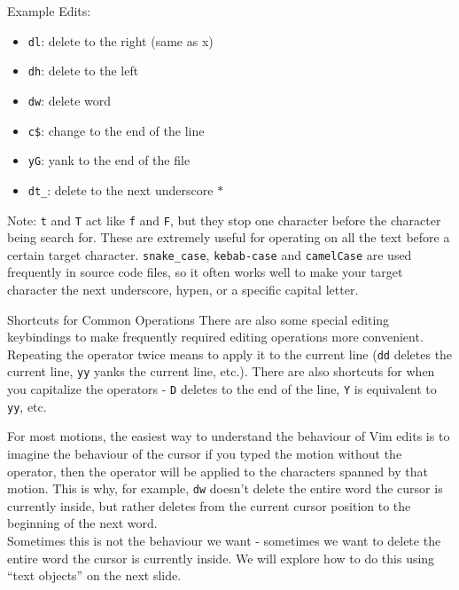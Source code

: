 \documentclass{beamer}
\begin{document}
\begin{frame}[fragile]
    Example Edits:
    \begin{itemize}
	\item \verb+dl+:  delete to the right (same as x)
	\item \verb+dh+:  delete to the left
	\item \verb+dw+:  delete word
	\item \verb+c$+:  change to the end of the line
	\item \verb+yG+:  yank to the end of the file
	\item \verb+dt_+:  delete to the next underscore $\ast$
    \end{itemize}
    Note: \verb+t+ and \verb+T+ act like \verb+f+ and \verb+F+, but they stop one character before the character being search for. These are extremely useful for operating on all the text before a certain target character. \verb+snake_case+, \verb+kebab-case+ and \verb+camelCase+ are used frequently in source code files, so it often works well to make your target character the next underscore, hypen, or a specific capital letter.
\end{frame}

\begin{frame}[fragile]
    \begin{block}{Shortcuts for Common Operations}
	There are also some special editing keybindings to make frequently required editing operations more convenient. Repeating the operator twice means to apply it to the current line (\verb+dd+ deletes the current line, \verb+yy+ yanks the current line, etc.). There are also shortcuts for when you capitalize the operators - \verb+D+ deletes to the end of the line, \verb+Y+ is equivalent to \verb+yy+, etc.
    \end{block}
\end{frame}

\begin{frame}[fragile]
    For most motions, the easiest way to understand the behaviour of Vim edits is to imagine the behaviour of the cursor if you typed the motion without the operator, then the operator will be applied to the characters spanned by that motion. This is why, for example, \verb+dw+ doesn't delete the entire word the cursor is currently inside, but rather deletes from the current cursor position to the beginning of the next word.\\
    \vspace{0.5cm}
    Sometimes this is not the behaviour we want - sometimes we want to delete the entire word the cursor is currently inside. We will explore how to do this using \enquote{text objects} on the next slide.
\end{frame}
\end{document}

